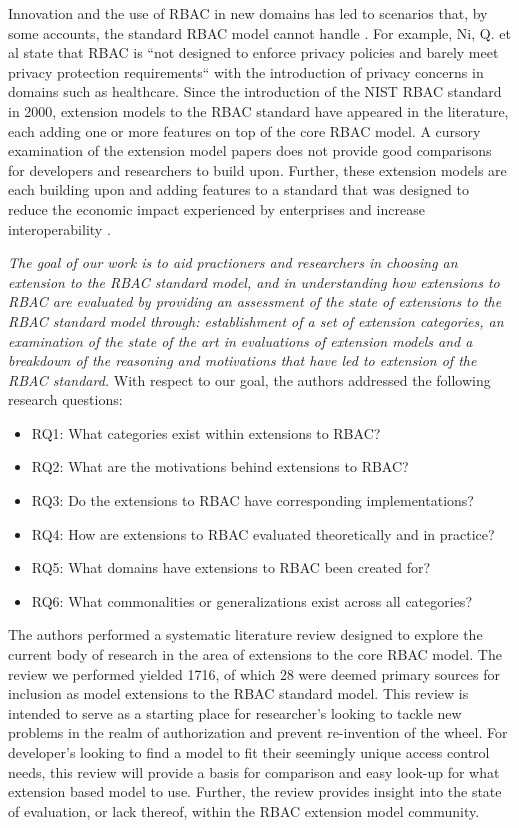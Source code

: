 Innovation and the use of RBAC in new domains has led to scenarios that, by some accounts, the standard RBAC model cannot handle \cite{kuhn2010adding}.  
For example, Ni, Q. et al \cite{ni2010privacy} state that RBAC is ``not designed to enforce privacy policies and barely 
meet privacy protection requirements`` with the introduction of privacy concerns in domains such as healthcare. 
Since the introduction of the NIST RBAC standard in 2000, extension models to the RBAC standard have appeared in the literature, each adding one or more features on top of the core RBAC model. 
A cursory examination of the extension model papers does not provide good comparisons for developers and researchers to build upon. 
Further, these extension models are each building upon and adding features to a standard that was designed to reduce the economic impact experienced by enterprises and increase interoperability \cite{o20102010}.



\textit{The goal of our work is to aid practioners and researchers in choosing an extension to the RBAC standard model, and in understanding
how extensions to RBAC are evaluated by providing an assessment of the state of extensions to the RBAC standard model through: establishment of a 
set of extension categories, an examination of the state of the art in evaluations of extension models and a breakdown of the reasoning and motivations
that have led to extension of the RBAC standard.} With respect to our goal, the authors addressed the following research questions:

\begin{itemize}
\setlength{\itemsep}{0.25pt}
\item RQ1: What categories exist within extensions to RBAC?
\item RQ2: What are the motivations behind extensions to RBAC?
\item RQ3: Do the extensions to RBAC have corresponding implementations?
\item RQ4: How are extensions to RBAC evaluated theoretically and in practice?
\item RQ5: What domains have extensions to RBAC been created for?
\item RQ6: What commonalities or generalizations exist across all categories?
\end{itemize}

The authors performed a systematic literature review designed to explore the current body of research in the area of extensions to the core RBAC model.  The review we performed yielded 1716, of which 28 were deemed primary sources for inclusion as model extensions to the RBAC standard model.  This review is intended to serve as a starting place for researcher's looking to tackle new problems in the realm of authorization and prevent re-invention of the wheel. For developer's looking to find a model to fit their seemingly unique access control needs, this review will provide a basis for comparison and easy look-up for what extension based model to use.  Further, the review provides insight into the state of evaluation, or lack thereof, within the RBAC extension model community.


